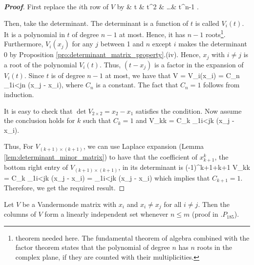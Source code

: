 \begin{proof}[\bf Proof]%
First replace the $i$th row of $V$ by
\be
{} & t & t^2 & \dots & t^{n-1} \eepm.
\ee

Then, take the determinant. The determinant is a function of $t$ is called $V_i(t)$. It is a polynomial in $t$ of degree $n-1$ at most. Hence, it has $n-1$ roots\footnote{theorem needed here. The fundamental theorem of algebra combined with the factor theorem states that the polynomial of degree $n$ has $n$ roots in the complex plane, if they are counted with their multiplicities.}.
Furthermore, $V_i(x_j)$ for any $j$ between 1 and $n$ except $i$ makes the determinant 0 by Proposition \ref{pro:determinant_matrix_property}.(iv). Hence, $x_j$ with $i\neq j$ is a root of the
polynomial $V_i(t)$. Thus, $(t - x_j)$ is a factor in the expansion of $V_i(t)$. Since $t$ is of degree $n-1$ at most, we have that %
\be
\det V = V_i(x_i) = C_n \prod_{1\leq i<j\leq n} (x_j - x_i),
\ee
where $C_n$ is a constant. The fact that $C_n=1$ follows from induction.

It is easy to check that $\det V_{2\times 2} = x_2 -x_1$ satisfies the condition. Now assume the conclusion holds for $k$ such that $C_k = 1$ and
\be
\det V_{k\times k} = C_k \prod_{1\leq i<j\leq k} (x_j - x_i).
\ee

Thus, For $V_{(k+1)\times(k+1)}$, we can use Laplace expansion (Lemma \ref{lem:determinant_minor_matrix}) to have that the coefficient of $x_{k+1}^{k}$, the bottom right entry of
$V_{(k+1)\times(k+1)}$, in its determinant is
\be
(-1)^{k+1+k+1} \det V_{k\times k} = C_k \prod_{1\leq i<j\leq k} (x_j - x_i) = \prod_{1\leq i<j\leq k} (x_j - x_i)
\ee
which implies that $C_{k+1} = 1$. Therefore, we get the required result.
\end{proof}


\begin{proposition}
Let $V$ be a Vandermonde matrix with $x_i$ and $x_i\neq x_j$ for all $i\neq j$. Then the columns of $V$ form a linearly independent set whenever $n\leq m$ (proof in \cite{Meyer_2001}.$P_{185}$).
\end{proposition}

